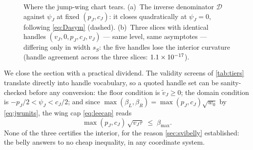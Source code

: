 \begin{figure}[htbp]
\centering
{}
\caption{Where the jump-wing chart tears.  (a)~The inverse denominator
$\mathcal{D}$ against $\psi_J$ at fixed $(p_J,c_J)$: it closes
quadratically at $\psi_J=0$, following \eqref{eq:Dasym} (dashed).
(b)~Three slices with identical handles $(v_J,0,p_J,c_J,v_J)$ --- same
level, same asymptotes --- differing only in width $s_S$: the five
handles lose the interior curvature (handle agreement across the three
slices: $1.1\times10^{-17}$).}
\label{fig:svistratum}
\end{figure}

We close the section with a practical dividend.  The validity screens
of \cref{tab:tiers} translate directly into handle vocabulary, so a
quoted handle set can be sanity-checked before any conversion: the
floor condition is $\tilde v_J\ge0$; the domain condition is
$-p_J/2<\psi_J<c_J/2$; and since
$\max(\beta_L,\beta_R)=\max(p_J,c_J)\sqrt{w_0}$ by \eqref{eq:jwunits},
the wing cap \eqref{eq:leecap} reads
\begin{equation}
\max(p_J,c_J)\,\sqrt{v_J\tau}\;\le\;\beta_{\max}.
\label{eq:jwcap}
\end{equation}
None of the three certifies the interior, for the reason
\cref{sec:svibelly} established: the belly answers to no cheap
inequality, in any coordinate system.

